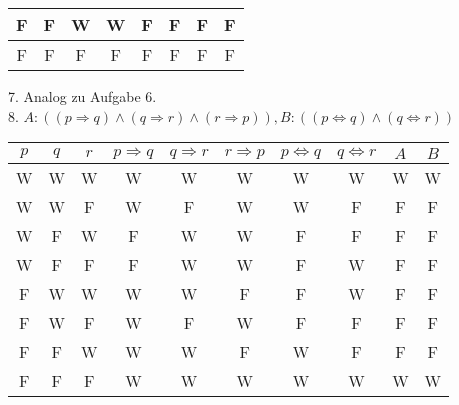 \documentclass[12pt]{exam}
\begin{document}
\begin{questions}
\begin{solution}
\begin{center}
\begin{tabular}{|c|c|c|c|c|c|c|c|}
			\hline F&F&W&W&F&F&F&F\\
			\hline F&F&F&F&F&F&F&F\\
			\hline
		\end{tabular}
	\end{center}
	7. Analog zu Aufgabe 6.\\
	8. $A: ((p\Rightarrow q)\land(q\Rightarrow r)\land(r\Rightarrow p)), B: ((p\Leftrightarrow q)\land(q\Leftrightarrow r))$
	\begin{center}
		\begin{tabular}{|c|c|c|c|c|c|c|c|c|c|}
			\hline $p$ & $q$ & $r$ & $p\Rightarrow q$ & $q\Rightarrow r$ & $r\Rightarrow p$ & $p\Leftrightarrow q$ & $q\Leftrightarrow r$ & $A$ & $B$\\
			\hline W&W&W&W&W&W&W&W&W&W\\
			\hline W&W&F&W&F&W&W&F&F&F\\
			\hline W&F&W&F&W&W&F&F&F&F\\
			\hline W&F&F&F&W&W&F&W&F&F\\
			\hline F&W&W&W&W&F&F&W&F&F\\
			\hline F&W&F&W&F&W&F&F&F&F\\
			\hline F&F&W&W&W&F&W&F&F&F\\
			\hline F&F&F&W&W&W&W&W&W&W\\
			\hline
		\end{tabular}
	\end{center}
\end{solution}





\end{questions}
\end{document}
